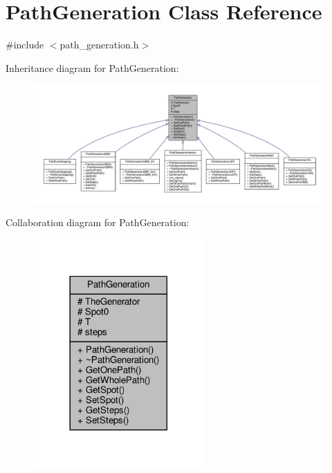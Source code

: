 \hypertarget{classPathGeneration}{}\section{Path\+Generation Class Reference}
\label{classPathGeneration}


{\ttfamily \#include $<$path\+\_\+generation.\+h$>$}



Inheritance diagram for Path\+Generation\+:
\nopagebreak
\begin{figure}[H]
\begin{center}
\leavevmode
\includegraphics[width=350pt]{classPathGeneration__inherit__graph}
\end{center}
\end{figure}


Collaboration diagram for Path\+Generation\+:
\nopagebreak
\begin{figure}[H]
\begin{center}
\leavevmode
\includegraphics[width=185pt]{classPathGeneration__coll__graph}
\end{center}
\end{figure}
